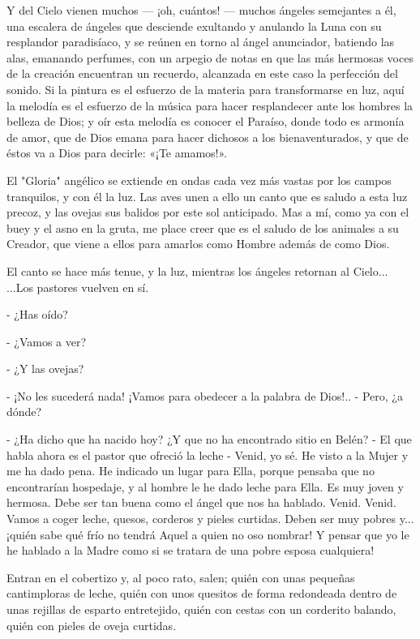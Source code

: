 \documentclass[12pt, twoside, openright]{book} %
\begin{document}
Y del Cielo vienen muchos — ¡oh, cuántos! — muchos ángeles semejantes a él, una escalera de ángeles que desciende exultando y anulando la Luna con su resplandor paradisíaco, y se reúnen en torno al ángel anunciador, batiendo las alas, emanando perfumes, con un arpegio de notas en que las más hermosas voces de la creación encuentran un recuerdo, alcanzada en este caso la perfección del sonido. Si la pintura es el esfuerzo de la materia para transformarse en luz, aquí la melodía es el esfuerzo de la música para hacer resplandecer ante los hombres la belleza de Dios; y oír esta melodía es conocer el Paraíso, donde todo es armonía de amor, que de Dios emana para hacer dichosos a los bienaventurados, y que de éstos va a Dios para decirle: «¡Te amamos!». 

El "Gloria" angélico se extiende en ondas cada vez más vastas por los campos tranquilos, y con él la luz. Las aves unen a ello un canto que es saludo a esta luz precoz, y las ovejas sus balidos por este sol anticipado. Mas a mí, como ya con el buey y el asno en la gruta, me place creer que es el saludo de los animales a su Creador, que viene a ellos para amarlos como Hombre además de como Dios. 

El canto se hace más tenue, y la luz, mientras los ángeles retornan al Cielo... ...Los pastores vuelven en sí. 

- ¿Has oído? 

- ¿Vamos a ver? 

- ¿Y las ovejas? 

- ¡No les sucederá nada! ¡Vamos para obedecer a la palabra de Dios!.. - Pero, ¿a dónde? 

- ¿Ha dicho que ha nacido hoy? ¿Y que no ha encontrado sitio en Belén? - El que habla ahora es el pastor que ofreció la leche - Venid, yo sé. He visto a la Mujer y me ha dado pena. He indicado un lugar para Ella, porque pensaba que no encontrarían hospedaje, y al hombre le he dado leche para Ella. Es muy joven y hermosa. Debe ser tan buena como el ángel que nos ha hablado. Venid. Venid. Vamos a coger leche, quesos, corderos y pieles curtidas. Deben ser muy pobres y... ¡quién sabe qué frío no tendrá Aquel a quien no oso nombrar! Y pensar que yo le he hablado a la Madre como si se tratara de una pobre esposa cualquiera!

Entran en el cobertizo y, al poco rato, salen; quién con unas pequeñas cantimploras de leche, quién con unos quesitos de forma redondeada dentro de unas rejillas de esparto entretejido, quién con cestas con un corderito balando, quién con pieles de oveja curtidas. 
\end{document}
